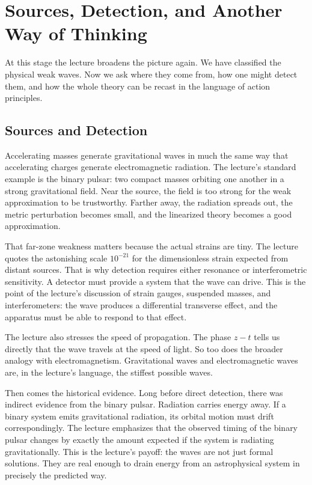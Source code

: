 \section{Sources, Detection, and Another Way of Thinking}

At this stage the lecture broadens the picture again. We have classified the physical weak waves. Now we ask where they come from, how one might detect them, and how the whole theory can be recast in the language of action principles.

\subsection{Sources and Detection}

Accelerating masses generate gravitational waves in much the same way that accelerating charges generate electromagnetic radiation. The lecture's standard example is the binary pulsar: two compact masses orbiting one another in a strong gravitational field. Near the source, the field is too strong for the weak approximation to be trustworthy. Farther away, the radiation spreads out, the metric perturbation becomes small, and the linearized theory becomes a good approximation.

That far-zone weakness matters because the actual strains are tiny. The lecture quotes the astonishing scale \(10^{-21}\) for the dimensionless strain expected from distant sources. That is why detection requires either resonance or interferometric sensitivity. A detector must provide a system that the wave can drive. This is the point of the lecture's discussion of strain gauges, suspended masses, and interferometers: the wave produces a differential transverse effect, and the apparatus must be able to respond to that effect.

The lecture also stresses the speed of propagation. The phase \(z-t\) tells us directly that the wave travels at the speed of light. So too does the broader analogy with electromagnetism. Gravitational waves and electromagnetic waves are, in the lecture's language, the stiffest possible waves.

Then comes the historical evidence. Long before direct detection, there was indirect evidence from the binary pulsar. Radiation carries energy away. If a binary system emits gravitational radiation, its orbital motion must drift correspondingly. The lecture emphasizes that the observed timing of the binary pulsar changes by exactly the amount expected if the system is radiating gravitationally. This is the lecture's payoff: the waves are not just formal solutions. They are real enough to drain energy from an astrophysical system in precisely the predicted way.

